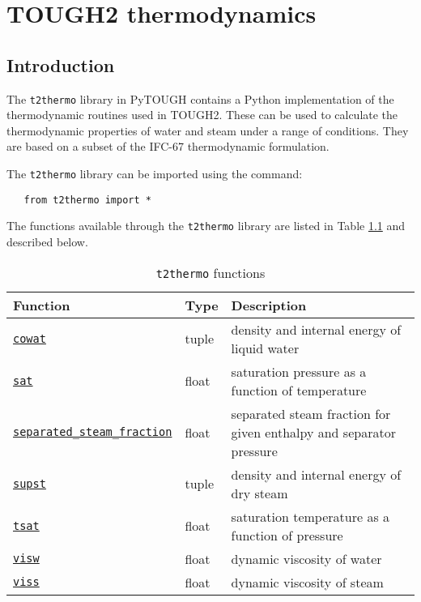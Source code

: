 \chapter{TOUGH2 thermodynamics}
\label{t2thermo}

\section{Introduction}
The \texttt{t2thermo} library in PyTOUGH contains a Python implementation of the thermodynamic routines used in TOUGH2.  These can be used to calculate the thermodynamic properties of water and steam under a range of conditions.  They are based on a subset of the IFC-67 thermodynamic formulation.

The \texttt{t2thermo} library can be imported using the command:

\begin{lstlisting} 
   from t2thermo import *
\end{lstlisting}

The functions available through the \texttt{t2thermo} library are listed in Table \ref{tb:t2thermo_functions} and described below.

\begin{table}
  \begin{center}
    \begin{tabular}{|l|l|p{65mm}|}
      \hline
      \textbf{Function} & \textbf{Type} & \textbf{Description}\\
      \hline
      \hyperref[sec:t2thermo:cowat]{\texttt{cowat}} & tuple & density and internal energy of liquid water\\
      \hyperref[sec:t2thermo:sat]{\texttt{sat}} & float & saturation pressure as a function of temperature\\
      \hyperref[sec:t2thermo:separated_steam_fraction]{\texttt{separated\_steam\_fraction}} & float & separated steam fraction for given enthalpy and separator pressure\\
      \hyperref[sec:t2thermo:supst]{\texttt{supst}} & tuple & density and internal energy of dry steam\\
      \hyperref[sec:t2thermo:tsat]{\texttt{tsat}} & float & saturation temperature as a function of pressure\\
      \hyperref[sec:t2thermo:visw]{\texttt{visw}} & float & dynamic viscosity of water\\
      \hyperref[sec:t2thermo:viss]{\texttt{viss}} & float & dynamic viscosity of steam\\
      \hline
    \end{tabular}
    \caption{\texttt{t2thermo} functions}
    \label{tb:t2thermo_functions}
  \end{center}
\end{table}

